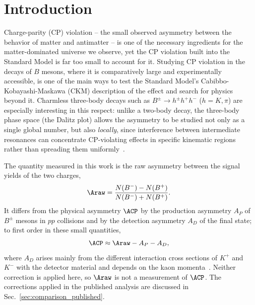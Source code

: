\section{Introduction}
\label{sec:intro}
Charge-parity (CP) violation -- the small observed asymmetry between the behavior of matter and antimatter -- is one of the necessary ingredients for the matter-dominated universe we observe, yet the CP violation built into the Standard Model is far too small to account for it. Studying CP violation in the decays of $B$ mesons, where it is comparatively large and experimentally accessible, is one of the main ways to test the Standard Model's Cabibbo-Kobayashi-Maskawa (CKM) description of the effect and search for physics beyond it. Charmless three-body decays such as $B^{\pm}\to h^{\pm}h^{+}h^{-}$ ($h=K,\pi$) are especially interesting in this respect: unlike a two-body decay, the three-body phase space (the Dalitz plot) allows the asymmetry to be studied not only as a single global number, but also \emph{locally}, since interference between intermediate resonances can concentrate CP-violating effects in specific kinematic regions rather than spreading them uniformly~\cite{lhcb_cpv_prd2023,lhcb_cpv_paper}.

The quantity measured in this work is the raw asymmetry between the signal yields of the two charges,
\begin{equation}
\Araw=\frac{N(B^-)-N(B^+)}{N(B^-)+N(B^+)} .
\label{eq:araw}
\end{equation}
It differs from the physical asymmetry $\ACP$ by the production asymmetry $A_P$ of $B^\pm$ mesons in $pp$ collisions and by the detection asymmetry $A_D$ of the final state; to first order in these small quantities,
\begin{equation}
\ACP\approx\Araw-A_P-A_D ,
\label{eq:acp}
\end{equation}
where $A_D$ arises mainly from the different interaction cross sections of $K^+$ and $K^-$ with the detector material and depends on the kaon momenta~\cite{lhcb_cpv_prd2023}. Neither correction is applied here, so $\Araw$ is not a measurement of $\ACP$. The corrections applied in the published analysis are discussed in Sec.~\ref{sec:comparison_published}.

